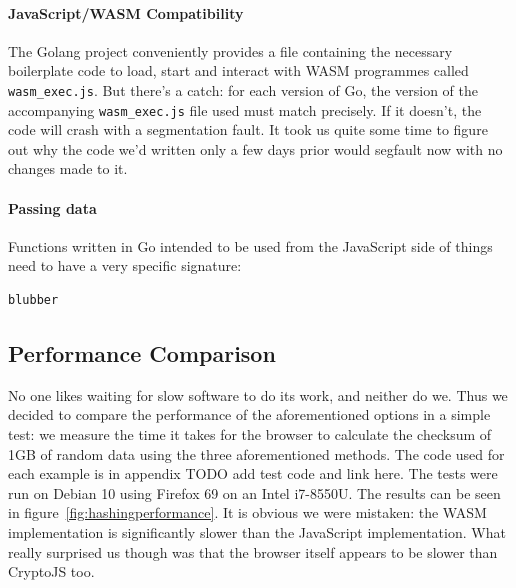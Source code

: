\paragraph{JavaScript/WASM Compatibility} The Golang project conveniently provides a file containing the necessary boilerplate code to load, start and interact with \gls{WASM} programmes called \texttt{wasm\_exec.js}.
But there's a catch: for each version of Go, the version of the accompanying \texttt{wasm\_exec.js} file used must match precisely.
If it doesn't, the code will crash with a segmentation fault.
It took us quite some time to figure out why the code we'd written only a few days prior would segfault now with no changes made to it.

\paragraph{Passing data} Functions written in Go intended to be used from the JavaScript side of things need to have a very specific signature:

\begin{lstlisting}[caption={Golang WASM function signature}, captionpos=b, language=Go, label={lst:funcsignaturewasm}]
    blubber
\end{lstlisting}


\subsection{Performance Comparison}
\label{subsec:perfcomphashing}
No one likes waiting for slow software to do its work, and neither do we.
Thus we decided to compare the performance of the aforementioned options in a simple test:
we measure the time it takes for the browser to calculate the checksum of 1GB of random data using the three aforementioned methods.
The code used for each example is in appendix TODO add test code and link here.
The tests were run on Debian 10 using Firefox 69 on an Intel i7-8550U.
The results can be seen in figure~\ref{fig:hashingperformance}.
It is obvious we were mistaken: the WASM implementation is significantly slower than the JavaScript implementation.
What really surprised us though was that the browser itself appears to be slower than CryptoJS too.

